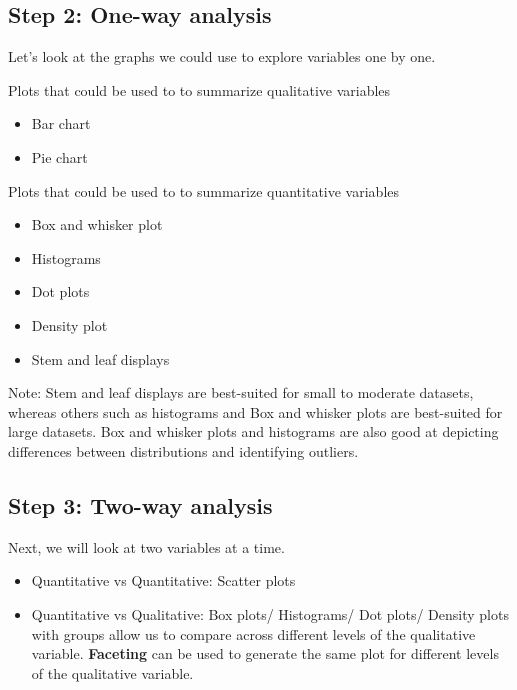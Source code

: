 \documentclass[]{article}
\begin{document}
\hypertarget{step-2-one-way-analysis}{%
\subsection{Step 2: One-way analysis}\label{step-2-one-way-analysis}}

Let's look at the graphs we could use to explore variables one by one.

Plots that could be used to to summarize qualitative variables

\begin{itemize}
\item
  Bar chart
\item
  Pie chart
\end{itemize}

Plots that could be used to to summarize quantitative variables

\begin{itemize}
\item
  Box and whisker plot
\item
  Histograms
\item
  Dot plots
\item
  Density plot
\item
  Stem and leaf displays
\end{itemize}

Note: Stem and leaf displays are best-suited for small to moderate
datasets, whereas others such as histograms and Box and whisker plots
are best-suited for large datasets. Box and whisker plots and histograms
are also good at depicting differences between distributions and
identifying outliers.

\hypertarget{step-3-two-way-analysis}{%
\subsection{Step 3: Two-way analysis}\label{step-3-two-way-analysis}}

Next, we will look at two variables at a time.

\begin{itemize}
\item
  Quantitative vs Quantitative: Scatter plots
\item
  Quantitative vs Qualitative: Box plots/ Histograms/ Dot plots/ Density
  plots with groups allow us to compare across different levels of the
  qualitative variable. \textbf{Faceting} can be used to generate the
  same plot for different levels of the qualitative variable.
\end{itemize}
\end{document}
